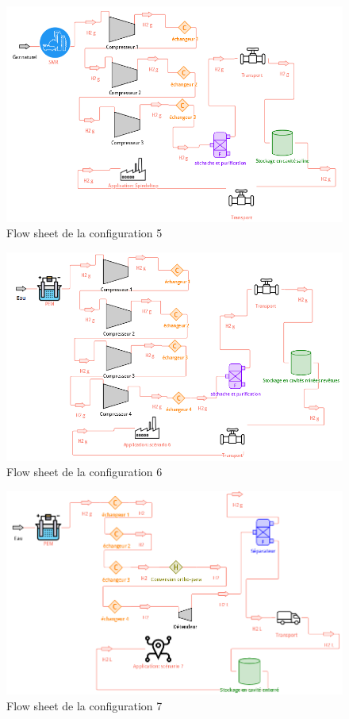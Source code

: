 \documentclass[11pt,french,a4paper]{article}
\begin{document}
\begin{figure}[h]
\centering
\includegraphics[width=0.8\linewidth]{image/annexe/annexe_flow/figure5annexea.png}
\caption{Flow sheet de la configuration 5 }
\end{figure}

\begin{figure}[h]
\centering
\includegraphics[width=0.8\linewidth]{image/annexe/annexe_flow/figure6annexea.png}
\caption{Flow sheet de la configuration 6 }
\end{figure}

\begin{figure}[h]
\centering
\includegraphics[width=0.8\linewidth]{image/annexe/annexe_flow/figure7annexea.png}
\caption{Flow sheet de la configuration 7 }
\end{figure}
\end{document}
